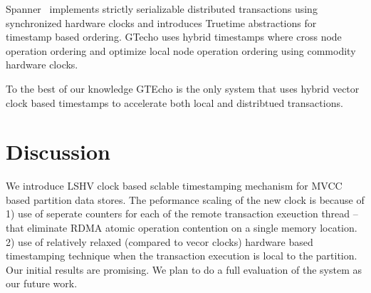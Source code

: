 Spanner~\cite{spanner} implements strictly serializable distributed transactions
using synchronized hardware clocks and introduces Truetime abstractions for 
timestamp based ordering. GTecho uses hybrid timestamps where cross node operation
ordering and optimize local node operation ordering using commodity hardware clocks.

To the best of our knowledge GTEcho is the only system that uses hybrid vector
clock based timestamps to accelerate both local and distribtued transactions.


\section{Discussion}

We introduce LSHV clock based sclable timestamping mechanism for MVCC based partition
data stores. The peformance scaling of the new clock is because of 1) use of seperate
counters for each of the remote transaction exeuction thread -- that eliminate RDMA
atomic operation contention on a single memory location. 2) use of relatively relaxed (compared to vecor clocks)
hardware based timestamping technique when the transaction execution is local to the partition.
Our initial results are promising. We plan to do a full evaluation of the system as our future work.


